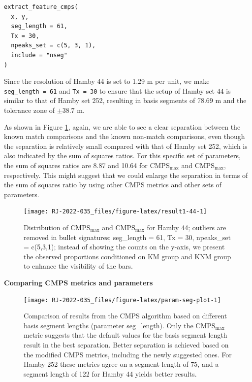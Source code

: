 \begin{verbatim}
extract_feature_cmps(
  x, y,
  seg_length = 61,
  Tx = 30,
  npeaks_set = c(5, 3, 1),
  include = "nseg"
)
\end{verbatim}

Since the resolution of Hamby 44 is set to 1.29 \textmu m per unit, we make \texttt{seg\_length\ =\ 61} and \texttt{Tx\ =\ 30} to ensure that the setup of Hamby set 44 is similar to that of Hamby set 252, resulting in basis segments of 78.69 \textmu m and the tolerance zone of \(\pm 38.7\) \textmu m.

As shown in Figure \ref{fig:result1-44}, again, we are able to see a clear separation between the known match comparisons and the known non-match comparisons, even though the separation is relatively small compared with that of Hamby set 252, which is also indicated by the sum of squares ratios.
For this specific set of parameters, the sum of squares ratios are 8.87 and 10.64 for \(\mathrm{CMPS_{max}}\) and \(\mathrm{\overline{CMPS}_{max}}\), respectively.
This might suggest that we could enlarge the separation in terms of the sum of squares ratio by using other CMPS metrics and other sets of parameters.

\begin{figure}

{\centering \texttt{[image: RJ-2022-035\_files/figure-latex/result1-44-1]} 

}

\caption{Distribution of $\mathrm{CMPS_{max}}$ and $\mathrm{\overline{CMPS}_{max}}$ for Hamby 44; outliers are removed in bullet signatures; seg\_length = 61, Tx = 30, npeaks\_set = c(5,3,1); instead of showing the counts on the y-axis, we present the observed proportions conditioned on KM group and KNM group to enhance the visibility of the bars. }\label{fig:result1-44}
\end{figure}

\textbf{Comparing CMPS metrics and parameters}

\begin{figure}

{\centering \texttt{[image: RJ-2022-035\_files/figure-latex/param-seg-plot-1]} 

}

\caption{Comparison of results from the CMPS algorithm based on different basis segment lengths (parameter seg\_length). Only the $\mathrm{CMPS_{max}}$ metric suggests that the default values for the basis segment length result in the best separation. Better separation is achieved based on the modified CMPS metrics, including the newly suggested ones. For Hamby 252 these metrics agree on a segment length of 75, and a segment length of 122 for Hamby 44 yields better results. }\label{fig:param-seg-plot}
\end{figure}


